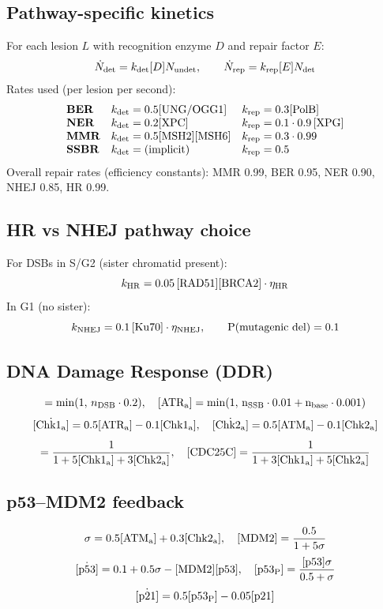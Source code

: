 \documentclass[11pt,a4paper]{article}
\newcommand{\eq}[1]{\begin{equation}#1\end{equation}}
\begin{document}
\subsection{Pathway-specific kinetics}
For each lesion $L$ with recognition enzyme $D$ and repair factor $E$:
\eq{ \dot N_{\rm det}=k_{\rm det}[D]N_{\rm undet},\qquad \dot N_{\rm rep}=k_{\rm rep}[E]N_{\rm det} }
Rates used (per lesion per second):
\[
\begin{array}{lll}
\textbf{BER} & k_{\rm det}=0.5[\rm UNG/OGG1] & k_{\rm rep}=0.3[\rm PolB] \\
\textbf{NER} & k_{\rm det}=0.2[\rm XPC] & k_{\rm rep}=0.1\cdot 0.9\,[\rm XPG] \\
\textbf{MMR} & k_{\rm det}=0.5[\rm MSH2][\rm MSH6] & k_{\rm rep}=0.3\cdot 0.99 \\
\textbf{SSBR} & k_{\rm det}=\text{(implicit)} & k_{\rm rep}=0.5 \\
\end{array}
\]
Overall repair rates (efficiency constants): MMR 0.99, BER 0.95, NER 0.90, NHEJ 0.85, HR 0.99.

\subsection{HR vs NHEJ pathway choice}
For DSBs in S/G2 (sister chromatid present):
\eq{ k_{\rm HR} = 0.05\,[\rm RAD51][\rm BRCA2]\cdot\eta_{\rm HR} }
In G1 (no sister):
\eq{ k_{\rm NHEJ}=0.1\,[\rm Ku70]\cdot\eta_{\rm NHEJ},\qquad P(\text{mutagenic del})=0.1 }

\subsection{DNA Damage Response (DDR)}
\eq{ [\rm ATM_a]=\min(1,\,n_{\rm DSB}\cdot 0.2),\quad [\rm ATR_a]=\min(1,\,n_{\rm SSB}\cdot 0.01+n_{\rm base}\cdot 0.001) }
\eq{ \dot{[\rm Chk1_a]}=0.5[\rm ATR_a]-0.1[\rm Chk1_a],\quad \dot{[\rm Chk2_a]}=0.5[\rm ATM_a]-0.1[\rm Chk2_a] }
\eq{ [\rm CDC25A]=\frac{1}{1+5[\rm Chk1_a]+3[\rm Chk2_a]},\quad [\rm CDC25C]=\frac{1}{1+3[\rm Chk1_a]+5[\rm Chk2_a]} }

\subsection{p53--MDM2 feedback}
\eq{ \sigma = 0.5[\rm ATM_a]+0.3[\rm Chk2_a],\quad [\rm MDM2]=\frac{0.5}{1+5\sigma} }
\eq{ \dot{[\rm p53]}=0.1+0.5\sigma-[\rm MDM2][\rm p53],\quad [\rm p53_P]=\frac{[\rm p53]\sigma}{0.5+\sigma} }
\eq{ \dot{[\rm p21]}=0.5[\rm p53_P]-0.05[\rm p21] }
\end{document}
